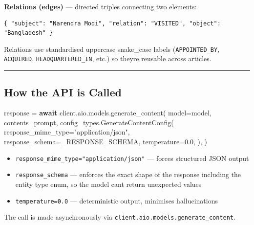 \documentclass[
]{article}
\newenvironment{Shaded}{}{}
\newcommand{\ControlFlowTok}[1]{\textcolor[rgb]{0.00,0.44,0.13}{\textbf{#1}}}
\newcommand{\FloatTok}[1]{\textcolor[rgb]{0.25,0.63,0.44}{#1}}
\newcommand{\NormalTok}[1]{#1}
\newcommand{\OperatorTok}[1]{\textcolor[rgb]{0.40,0.40,0.40}{#1}}
\newcommand{\StringTok}[1]{\textcolor[rgb]{0.25,0.44,0.63}{#1}}
\providecommand{\tightlist}{%
  \setlength{\itemsep}{0pt}\setlength{\parskip}{0pt}}
\begin{document}
\textbf{Relations (edges)} --- directed triples connecting two elements:

\begin{verbatim}
{ "subject": "Narendra Modi", "relation": "VISITED", "object": "Bangladesh" }
\end{verbatim}

Relations use standardised uppercase snake\_case labels
(\texttt{APPOINTED\_BY}, \texttt{ACQUIRED}, \texttt{HEADQUARTERED\_IN},
etc.) so they\textquotesingle re reusable across articles.

\begin{center}\rule{0.5\linewidth}{0.5pt}\end{center}

\subsection{How the API is Called}\label{how-the-api-is-called}

\begin{Shaded}
\begin{Highlighting}[]
\NormalTok{response }\OperatorTok{=} \ControlFlowTok{await}\NormalTok{ client.aio.models.generate\_content(}
\NormalTok{    model}\OperatorTok{=}\NormalTok{model,}
\NormalTok{    contents}\OperatorTok{=}\NormalTok{prompt,}
\NormalTok{    config}\OperatorTok{=}\NormalTok{types.GenerateContentConfig(}
\NormalTok{        response\_mime\_type}\OperatorTok{=}\StringTok{"application/json"}\NormalTok{,}
\NormalTok{        response\_schema}\OperatorTok{=}\NormalTok{\_RESPONSE\_SCHEMA,}
\NormalTok{        temperature}\OperatorTok{=}\FloatTok{0.0}\NormalTok{,}
\NormalTok{    ),}
\NormalTok{)}
\end{Highlighting}
\end{Shaded}

\begin{itemize}
\tightlist
\item
  \texttt{response\_mime\_type="application/json"} --- forces structured
  JSON output
\item
  \texttt{response\_schema} --- enforces the exact shape of the response
  including the entity type enum, so the model can\textquotesingle t
  return unexpected values
\item
  \texttt{temperature=0.0} --- deterministic output, minimises
  hallucinations
\end{itemize}

The call is made asynchronously via
\texttt{client.aio.models.generate\_content}.
\end{document}
